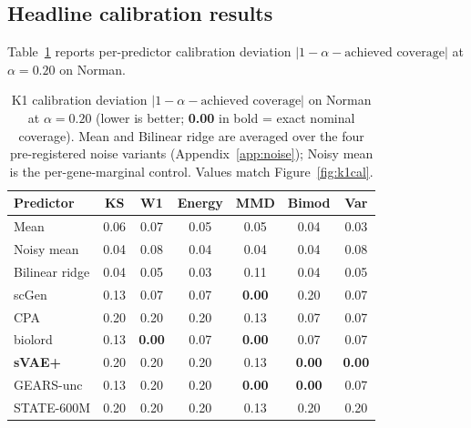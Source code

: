 \documentclass{article}
\begin{document}
\subsection{Headline calibration results}
Table~\ref{tab:k1} reports per-predictor calibration deviation $|1 - \alpha - \text{achieved coverage}|$ at $\alpha = 0.20$ on Norman.

\begin{table}[h]
\caption{K1 calibration deviation $|1-\alpha-\text{achieved coverage}|$ on Norman at $\alpha = 0.20$ (lower is better; \textbf{0.00} in bold = exact nominal coverage). Mean and Bilinear ridge are averaged over the four pre-registered noise variants (Appendix~\ref{app:noise}); Noisy mean is the per-gene-marginal control. Values match Figure~\ref{fig:k1cal}.}
\label{tab:k1}
\vskip 0.1in
\begin{center}
\begin{small}
\setlength{\tabcolsep}{3.5pt}
\begin{tabular}{lcccccc}
\toprule
Predictor & KS & W1 & Energy & MMD & Bimod & Var \\
\midrule
Mean & 0.06 & 0.07 & 0.05 & 0.05 & 0.04 & 0.03 \\
Noisy mean & 0.04 & 0.08 & 0.04 & 0.04 & 0.04 & 0.08 \\
Bilinear ridge & 0.04 & 0.05 & 0.03 & 0.11 & 0.04 & 0.05 \\
scGen & 0.13 & 0.07 & 0.07 & \textbf{0.00} & 0.20 & 0.07 \\
CPA & 0.20 & 0.20 & 0.20 & 0.13 & 0.07 & 0.07 \\
biolord & 0.13 & \textbf{0.00} & 0.07 & \textbf{0.00} & 0.07 & 0.07 \\
\textbf{sVAE+} & 0.20 & 0.20 & 0.20 & 0.13 & \textbf{0.00} & \textbf{0.00} \\
GEARS-unc & 0.13 & 0.20 & 0.20 & \textbf{0.00} & \textbf{0.00} & 0.07 \\
STATE-600M & 0.20 & 0.20 & 0.20 & 0.13 & 0.20 & 0.20 \\
\bottomrule
\end{tabular}
\end{small}
\end{center}
\vskip -0.1in
\end{table}
\end{document}
